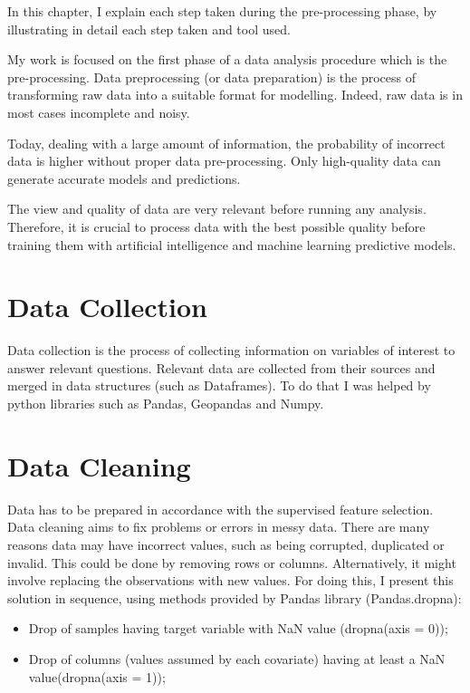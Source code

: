 In this chapter, I explain each step taken during the pre-processing phase, by illustrating in detail each step taken and tool used. \newline
\par
My work is focused on the first phase of a data analysis procedure which is the pre-processing.
Data preprocessing (or data preparation) is the process of transforming raw data into a suitable format for modelling. 
Indeed, raw data is in most cases incomplete and noisy.\par
Today, dealing with a large amount of information, the probability of incorrect data is higher without proper data pre-processing.
Only high-quality data can generate accurate models and predictions. \par
The view and quality of data are very relevant before running any analysis.
Therefore, it is crucial to process data with the best possible quality before training them with artificial intelligence and machine learning predictive models.\par
\section{Data Collection}
Data collection is the process of collecting information on variables of interest to answer relevant questions. \newline
Relevant data are collected from their sources and merged in data structures (such as Dataframes). 
To do that I was helped by python libraries such as Pandas, Geopandas and Numpy.
\section{Data Cleaning}
\label{sec:Data cleaning}
Data has to be prepared in accordance with the supervised feature selection.
Data cleaning aims to fix problems or errors in messy data. There are many reasons data may have incorrect values, such as being corrupted, duplicated or invalid. \newline
This could be done by removing rows or columns. Alternatively, it might involve replacing the observations with new values. \newline
For doing this, I present this solution in sequence, using methods provided by Pandas library (Pandas.dropna):
\begin{itemize}
\item Drop of samples having target variable with NaN value (dropna(axis = 0));
\item Drop of columns (values assumed by each covariate) having at least a NaN value(dropna(axis = 1));
\end{itemize}
